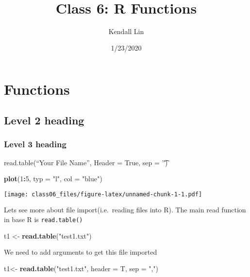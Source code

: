 \documentclass[
]{article}
\title{Class 6: R Functions}
\author{Kendall Lin}
\date{1/23/2020}
\newenvironment{Shaded}{\begin{snugshade}}{\end{snugshade}}
\newcommand{\DataTypeTok}[1]{\textcolor[rgb]{0.13,0.29,0.53}{#1}}
\newcommand{\DecValTok}[1]{\textcolor[rgb]{0.00,0.00,0.81}{#1}}
\newcommand{\KeywordTok}[1]{\textcolor[rgb]{0.13,0.29,0.53}{\textbf{#1}}}
\newcommand{\NormalTok}[1]{#1}
\newcommand{\OperatorTok}[1]{\textcolor[rgb]{0.81,0.36,0.00}{\textbf{#1}}}
\newcommand{\StringTok}[1]{\textcolor[rgb]{0.31,0.60,0.02}{#1}}
\begin{document}
\maketitle

\hypertarget{functions}{%
\section{Functions}\label{functions}}

\hypertarget{level-2-heading}{%
\subsection{Level 2 heading}\label{level-2-heading}}

\hypertarget{level-3-heading}{%
\subsubsection{Level 3 heading}\label{level-3-heading}}

read.table(``Your File Name'', Header = True, sep = '\t')

\begin{Shaded}
\begin{Highlighting}[]
\KeywordTok{plot}\NormalTok{(}\DecValTok{1}\OperatorTok{:}\DecValTok{5}\NormalTok{, }\DataTypeTok{typ =} \StringTok{"l"}\NormalTok{, }\DataTypeTok{col =} \StringTok{"blue"}\NormalTok{)}
\end{Highlighting}
\end{Shaded}

\texttt{[image: class06\_files/figure-latex/unnamed-chunk-1-1.pdf]}

Lets see more about file import(i.e.~reading files into R). The main
read function in base R is \texttt{read.table()}

\begin{Shaded}
\begin{Highlighting}[]
\NormalTok{t1 <-}\StringTok{ }\KeywordTok{read.table}\NormalTok{(}\StringTok{"test1.txt"}\NormalTok{)}
\end{Highlighting}
\end{Shaded}

We need to add arguments to get this file imported

\begin{Shaded}
\begin{Highlighting}[]
\NormalTok{t1<-}\StringTok{ }\KeywordTok{read.table}\NormalTok{(}\StringTok{"test1.txt"}\NormalTok{, }\DataTypeTok{header =}\NormalTok{ T, }\DataTypeTok{sep =} \StringTok{","}\NormalTok{)}
\end{Highlighting}
\end{Shaded}
\end{document}
